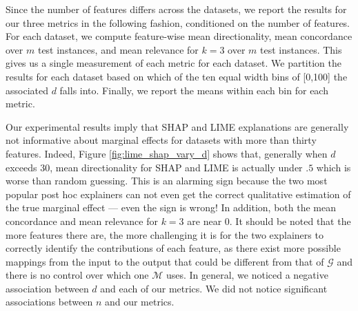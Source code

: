 \documentclass[12pt]{article}  %
\newcommand{\mG}{\mathcal{G}}
\newcommand{\mM}{\mathcal{M}}
\begin{document}
        Since the number of features differs across the datasets, we report the results for our three metrics in the following fashion, conditioned on the number of features. %
        For each dataset, we compute feature-wise mean directionality, mean concordance over $m$ test instances, and mean relevance for $k=3$ over $m$ test instances. This gives us a single measurement of each metric for each dataset. We partition the results for each dataset based on which of the ten equal width bins of [0,100] the associated $d$ falls into. Finally, we report the means within each bin for each metric.  %

    
    Our experimental results imply that SHAP and LIME explanations are generally not informative about marginal effects for datasets with more than thirty features. Indeed, Figure \ref{fig:lime_shap_vary_d} shows that, generally when $d$ exceeds $30$, mean directionality for SHAP and LIME is actually under $.5$ which is worse than random guessing. This is an alarming sign because the two most popular post hoc explainers can not even get the correct qualitative estimation of the true marginal effect --- even the sign is wrong! In addition, both the mean concordance and mean relevance for $k=3$ are near $0$. It should be noted that the more features there are, the more challenging it is for the two explainers to correctly identify the contributions of each feature, as there exist more possible mappings from the input to the output that could be different from that of $\mG$ and there is no control over which one $\mM$ uses. In general, we noticed a negative association between $d$ and each of our metrics. We did not notice significant associations between $n$ and our metrics.
\end{document}
